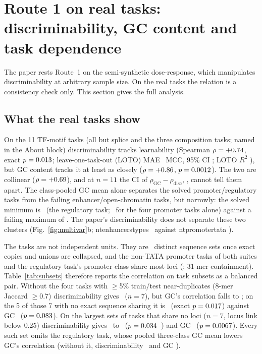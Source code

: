 \documentclass[journal,onecolumn,10pt,letterpaper]{IEEEtran}
\newcommand{\tasku}{\textunderscore\allowbreak}
\DeclareRobustCommand{\task}[1]{{\normalfont\ttfamily\upshape\let\_\tasku #1}}
\begin{document}
\section{Route 1 on real tasks: discriminability, GC content and task dependence}\label{sec:s2}

The paper rests Route~1 on the semi-synthetic dose-response, which manipulates discriminability at
arbitrary sample size. On the real tasks the relation is a consistency check only. This section
gives the full analysis.

\subsection{What the real tasks show}\label{sec:s2real}
On the 11 TF-motif tasks (all but splice and the three composition tasks; named in the About block)
discriminability tracks learnability (Spearman $\rho=+0.74$, exact
$p=0.013$; leave-one-task-out (LOTO) MAE \smLotoMAE\ MCC, 95\% CI \smLotoMAECI; LOTO $R^2$
\smLotoRsq), but GC content
tracks it at least as closely ($\rho=+0.86$, $p=0.0012$). The two are collinear
($\rho=+0.69$), and at $n=11$ the CI of $\rho_\mathrm{GC}-\rho_\mathrm{disc}$, \smRdiffCI, cannot
tell them apart. The class-pooled GC mean alone separates the solved promoter/regulatory tasks from
the failing enhancer/open-chromatin tasks, but narrowly: the solved minimum is \smGCsolvedMin\ (the regulatory
task; \smGCpromMin\ for the four promoter tasks alone) against a failing maximum of \smGCfailMax.
The paper's discriminability does not separate these two clusters (Fig.~\ref{fig:multivar}b;
\task{nt\_enhancers\_types} \smDiscTypes\ against \task{nt\_promoter\_tata} \smDiscPromTata).

The tasks are not independent units. They are \smNdistinct\ distinct sequence sets once exact copies
and unions are collapsed, and the non-TATA promoter tasks of both suites and the regulatory task's
promoter class share most loci (\smLinkRange; 31-mer containment). Table~\ref{tab:subsets} therefore
reports the correlation on task subsets as a balanced pair. Without the four tasks with $\ge$5\%
train/test near-duplicates (8-mer Jaccard $\ge$0.7) discriminability gives \smRcleanSeven\ ($n=7$),
but GC's correlation falls to \smRgcCleanSeven; on the 5 of those 7 with no exact sequence sharing
it is \smRfive\ (exact $p=0.017$) against GC \smRgcFive\ ($p=0.083$). On the largest sets of
tasks that share no loci ($n=7$, locus link below 0.25) discriminability gives \smRsevenLo\ to
\smRsevenHi\ ($p=0.034$--\smPsevenHi) and GC \smRgcSeven\ ($p=0.0067$). Every such set
omits the regulatory task, whose pooled three-class GC mean lowers GC's correlation (without it,
discriminability \smRnoReg\ and GC \smRgcNoReg).
\end{document}
